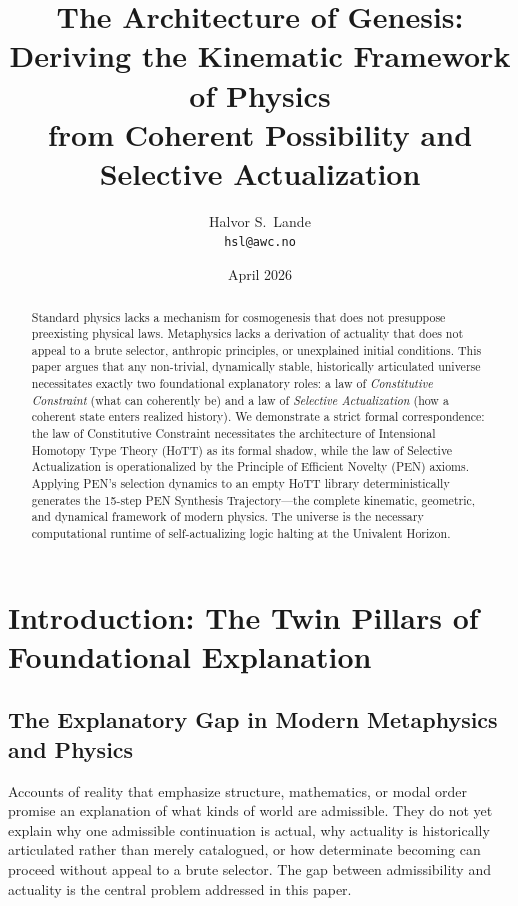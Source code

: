 \documentclass[11pt,a4paper]{article}
\title{\textbf{The Architecture of Genesis:\\
Deriving the Kinematic Framework of Physics\\
from Coherent Possibility and Selective Actualization}}
\author{Halvor S.\ Lande\\
\texttt{hsl@awc.no}}
\date{April 2026}
\theoremstyle{plain}
\theoremstyle{definition}
\theoremstyle{remark}
\begin{document}
\maketitle

\begin{abstract}
Standard physics lacks a mechanism for cosmogenesis that does not presuppose preexisting physical laws.  Metaphysics lacks a derivation of actuality that does not appeal to a brute selector, anthropic principles, or unexplained initial conditions.  This paper argues that any non-trivial, dynamically stable, historically articulated universe necessitates exactly two foundational explanatory roles: a law of \emph{Constitutive Constraint} (what can coherently be) and a law of \emph{Selective Actualization} (how a coherent state enters realized history).  We demonstrate a strict formal correspondence: the law of Constitutive Constraint necessitates the architecture of Intensional Homotopy Type Theory (HoTT) as its formal shadow, while the law of Selective Actualization is operationalized by the Principle of Efficient Novelty (PEN) axioms.  Applying PEN's selection dynamics to an empty HoTT library deterministically generates the 15-step PEN Synthesis Trajectory---the complete kinematic, geometric, and dynamical framework of modern physics.  The universe is the necessary computational runtime of self-actualizing logic halting at the Univalent Horizon.
\end{abstract}

\tableofcontents
\clearpage


\section{Introduction: The Twin Pillars of Foundational Explanation}
\label{sec:introduction}

\subsection{The Explanatory Gap in Modern Metaphysics and Physics}
\label{sec:gap}

Accounts of reality that emphasize structure, mathematics, or modal order promise an explanation of what kinds of world are admissible.  They do not yet explain why one admissible continuation is actual, why actuality is historically articulated rather than merely catalogued, or how determinate becoming can proceed without appeal to a brute selector.  The gap between admissibility and actuality is the central problem addressed in this paper.
\end{document}
